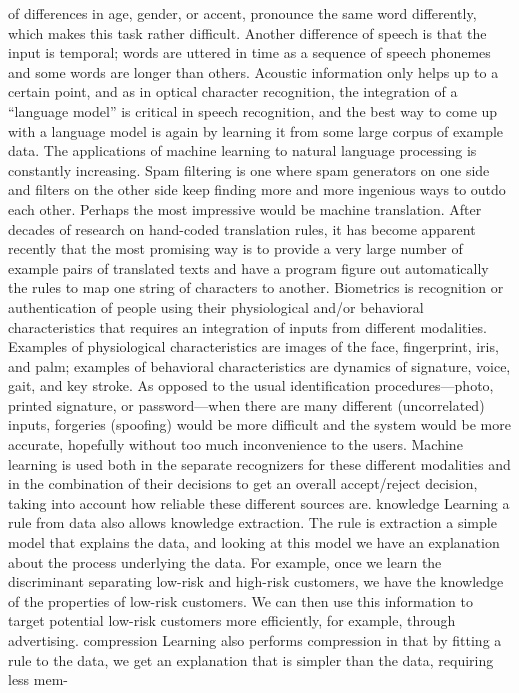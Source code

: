 of differences in age, gender, or accent, pronounce the same word differently, which makes this task rather difficult. Another difference of speech is that the input is temporal; words are uttered in time as a sequence of speech phonemes and some words are longer than others. Acoustic information only helps up to a certain point, and as in optical character recognition, the integration of a “language model” is critical in speech recognition, and the best way to come up with a language model is again by learning it from some large corpus of example data. The applications of machine learning to natural language processing is constantly increasing. Spam filtering is one where spam generators on one side and filters on the other side keep finding more and more ingenious ways to outdo each other. Perhaps the most impressive would be machine translation. After decades of research on hand-coded translation rules, it has become apparent recently that the most promising way is to provide a very large number of example pairs of translated texts and have a program figure out automatically the rules to map one string of characters to another. Biometrics is recognition or authentication of people using their physiological and/or behavioral characteristics that requires an integration of inputs from different modalities. Examples of physiological characteristics are images of the face, fingerprint, iris, and palm; examples of behavioral characteristics are dynamics of signature, voice, gait, and key stroke. As opposed to the usual identification procedures---photo, printed signature, or password---when there are many different (uncorrelated) inputs, forgeries (spoofing) would be more difficult and the system would be more accurate, hopefully without too much inconvenience to the users. Machine learning is used both in the separate recognizers for these different modalities and in the combination of their decisions to get an overall accept/reject decision, taking into account how reliable these different sources are. knowledge Learning a rule from data also allows knowledge extraction. The rule is extraction a simple model that explains the data, and looking at this model we have an explanation about the process underlying the data. For example, once we learn the discriminant separating low-risk and high-risk customers, we have the knowledge of the properties of low-risk customers. We can then use this information to target potential low-risk customers more efficiently, for example, through advertising. compression Learning also performs compression in that by fitting a rule to the data, we get an explanation that is simpler than the data, requiring less mem-

